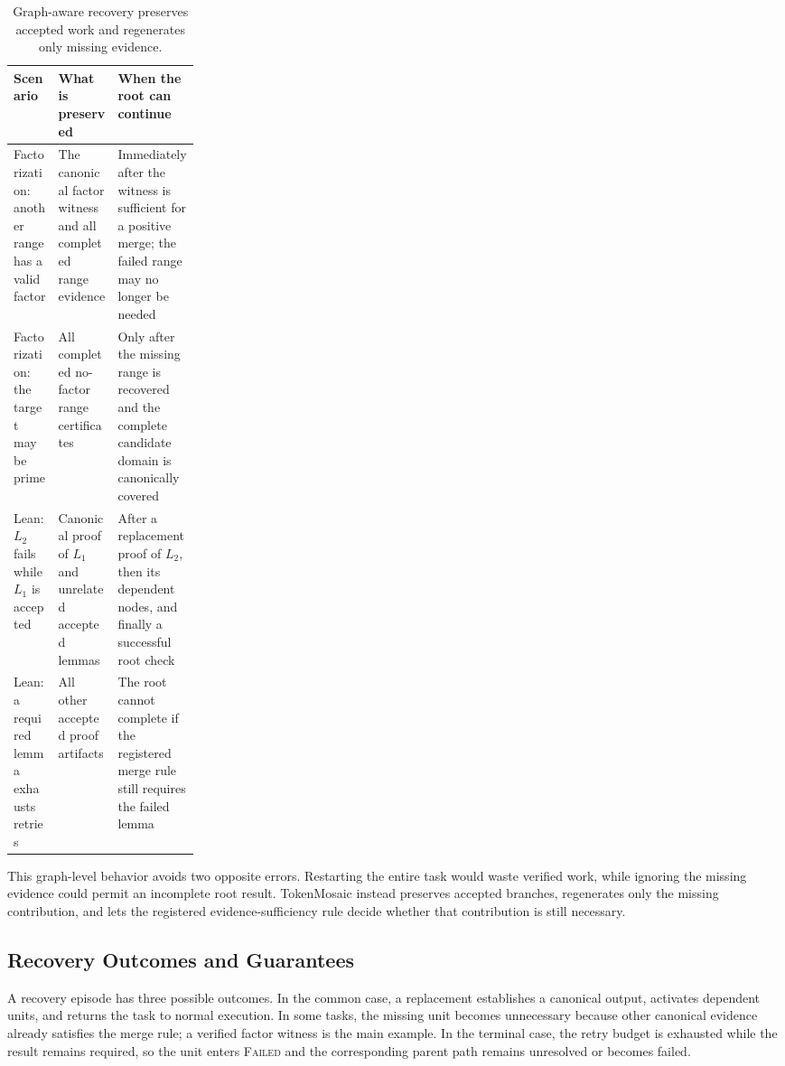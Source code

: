 \documentclass{article}
\theoremstyle{plain}
\begin{document}
\begin{table}[!h]
\centering
\small
\renewcommand{\arraystretch}{1.16}
\caption{Graph-aware recovery preserves accepted work and regenerates only missing evidence.}
\label{tab:graph-recovery-balanced}
\begin{tabularx}{\linewidth}{@{}p{0.24\linewidth}X X@{}}
\toprule
\textbf{Scenario} & \textbf{What is preserved} & \textbf{When the root can continue} \\
\midrule
Factorization: another range has a valid factor & The canonical factor witness and all completed range evidence & Immediately after the witness is sufficient for a positive merge; the failed range may no longer be needed \\
Factorization: the target may be prime & All completed no-factor range certificates & Only after the missing range is recovered and the complete candidate domain is canonically covered \\
Lean: $L_2$ fails while $L_1$ is accepted & Canonical proof of $L_1$ and unrelated accepted lemmas & After a replacement proof of $L_2$, then its dependent nodes, and finally a successful root check \\
Lean: a required lemma exhausts retries & All other accepted proof artifacts & The root cannot complete if the registered merge rule still requires the failed lemma \\
\bottomrule
\end{tabularx}
\end{table}

This graph-level behavior avoids two opposite errors. Restarting the entire task would waste verified work, while ignoring the missing evidence could permit an incomplete root result. TokenMosaic instead preserves accepted branches, regenerates only the missing contribution, and lets the registered evidence-sufficiency rule decide whether that contribution is still necessary.

\subsection{Recovery Outcomes and Guarantees}
\label{subsec:recovery-outcomes}

A recovery episode has three possible outcomes. In the common case, a replacement establishes a canonical output, activates dependent units, and returns the task to normal execution. In some tasks, the missing unit becomes unnecessary because other canonical evidence already satisfies the merge rule; a verified factor witness is the main example. In the terminal case, the retry budget is exhausted while the result remains required, so the unit enters \textsc{Failed} and the corresponding parent path remains unresolved or becomes failed.
\end{document}
